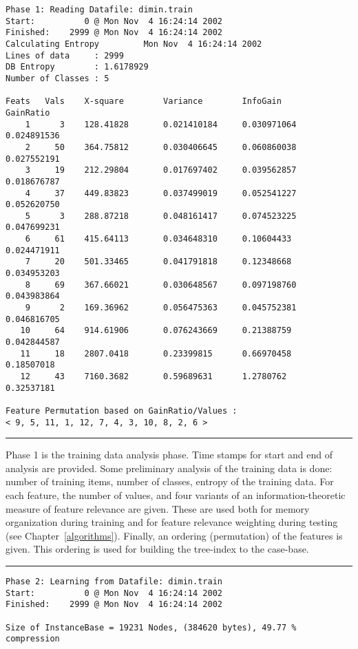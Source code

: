 \documentclass{report}
\begin{document}
{\small
\begin{verbatim}
Phase 1: Reading Datafile: dimin.train
Start:          0 @ Mon Nov  4 16:24:14 2002
Finished:    2999 @ Mon Nov  4 16:24:14 2002
Calculating Entropy         Mon Nov  4 16:24:14 2002
Lines of data     : 2999
DB Entropy        : 1.6178929
Number of Classes : 5

Feats   Vals    X-square        Variance        InfoGain        GainRatio
    1      3    128.41828       0.021410184     0.030971064     0.024891536
    2     50    364.75812       0.030406645     0.060860038     0.027552191
    3     19    212.29804       0.017697402     0.039562857     0.018676787
    4     37    449.83823       0.037499019     0.052541227     0.052620750
    5      3    288.87218       0.048161417     0.074523225     0.047699231
    6     61    415.64113       0.034648310     0.10604433      0.024471911
    7     20    501.33465       0.041791818     0.12348668      0.034953203
    8     69    367.66021       0.030648567     0.097198760     0.043983864
    9      2    169.36962       0.056475363     0.045752381     0.046816705
   10     64    914.61906       0.076243669     0.21388759      0.042844587
   11     18    2807.0418       0.23399815      0.66970458      0.18507018
   12     43    7160.3682       0.59689631      1.2780762       0.32537181

Feature Permutation based on GainRatio/Values :
< 9, 5, 11, 1, 12, 7, 4, 3, 10, 8, 2, 6 >
\end{verbatim}
}

\rule{\textwidth}{0.5mm}

\vspace{1cm}

Phase 1 is the training data analysis phase. Time stamps for start and
end of analysis are provided. Some preliminary analysis of the
training data is done: number of training items, number of classes,
entropy of the training data. For each feature, the number of values,
and four variants of an information-theoretic measure of feature
relevance are given. These are used both for memory organization
during training and for feature relevance weighting during testing
(see Chapter~\ref{algorithms}). Finally, an ordering (permutation) of
the features is given. This ordering is used for building the
tree-index to the case-base.

\vspace{1cm}

\rule{\textwidth}{0.5mm}


{\small
\begin{verbatim}
Phase 2: Learning from Datafile: dimin.train
Start:          0 @ Mon Nov  4 16:24:14 2002
Finished:    2999 @ Mon Nov  4 16:24:14 2002

Size of InstanceBase = 19231 Nodes, (384620 bytes), 49.77 % compression
\end{verbatim}
}
\end{document}
